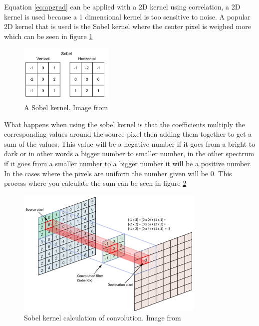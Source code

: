 Equation \ref{eq:apgrad} can be applied with a 2D kernel using correlation, a 2D kernel is used because a 1 dimensional kernel is too sensitive to noise. A popular 2D kernel that is used is the Sobel kernel where the center pixel is weighed more which can be seen in figure \ref{fig: sobel}

\begin{figure}[H]  %
	\centering
	\includegraphics[width=0.4\textwidth]{8Misc/Pictures/Introduction/Sobel.png}
	\caption{A Sobel kernel. Image from \citep[ Chapter~5.2.2]{book:Moeslund}}
	\label{fig: sobel}
\end{figure}

What happens when using the sobel kernel is that the coefficients multiply the corresponding values around the source pixel then adding them together to get a sum of the values. This value will be a negative number if it goes from a bright to dark or in other words a bigger number to smaller number, in the other spectrum if it goes from a smaller number to a bigger number it will be a positive number. In the cases where the pixels are uniform the number given will be 0. This process where you calculate the sum can be seen in figure \ref{fig: convolve}

\begin{figure}[H]  %
	\centering
	\includegraphics[width=0.8\textwidth]{8Misc/Pictures/Introduction/Sobel convolution.png}
	\caption{Sobel kernel calculation of convolution. Image from \citep{Medium}}
	\label{fig: convolve}
\end{figure}

